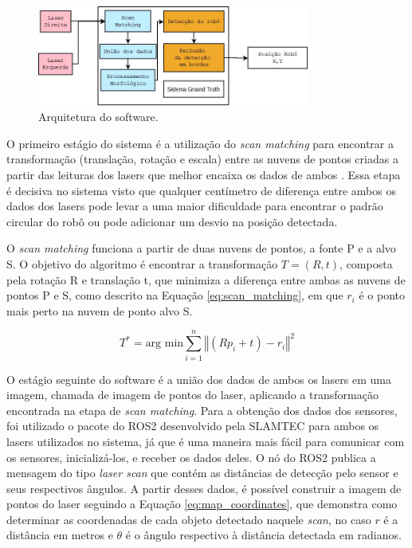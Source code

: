 \documentclass[acronym, symbols, table, deposito]{fei}
\begin{document}
				\begin{figure}[!htb]
					\centering
					\includegraphics[width=0.80\textwidth]{software_architecture.jpeg}
					\caption{Arquitetura do software.} \label{fig:software_architecture}
				\end{figure}
			
				O primeiro estágio do sistema é a utilização do \textit{scan matching} para encontrar a transformação (translação, rotação e escala) entre as nuvens de pontos criadas a partir das leituras dos lasers que melhor encaixa os dados de ambos \cite{NIETO200739}. Essa etapa é decisiva no sistema visto que qualquer centímetro de diferença entre ambos os dados dos lasers pode levar a uma maior dificuldade para encontrar o padrão circular do robô ou pode adicionar um desvio na posição detectada.
								
				O \textit{scan matching} funciona a partir de duas nuvens de pontos, a fonte P e a alvo S. O objetivo do algoritmo é encontrar a transformação $T = (R, t)$, composta pela rotação R e translação t, que minimiza a diferença entre ambas as nuvens de pontos P e S, como descrito na Equação \eqref{eq:scan_matching}, em que $r_i$ é o ponto mais perto na nuvem de ponto alvo S.
				
				\begin{equation} \label{eq:scan_matching}
					T^* = \text{arg min} \sum_{i=1}^{n}\left\Vert (Rp_i + t) - r_i \right\Vert^2
				\end{equation}
			
				O estágio seguinte do software é a união dos dados de ambos os lasers em uma imagem, chamada de imagem de pontos do laser, aplicando a transformação encontrada na etapa de \textit{scan matching}. Para a obtenção dos dados dos sensores, foi utilizado o pacote do ROS2 desenvolvido pela SLAMTEC para ambos os lasers utilizados no sistema, já que é uma maneira mais fácil para comunicar com os sensores, inicializá-los, e receber os dados deles. O nó do ROS2 publica a mensagem do tipo \textit{laser scan} que contém as distâncias de detecção pelo sensor e seus respectivos ângulos. A partir desses dados, é possível construir a imagem de pontos do laser seguindo a Equação \eqref{eq:map_coordinates}, que demonstra como determinar as coordenadas de cada objeto detectado naquele \textit{scan}, no caso $r$ é a distância em metros e $\theta$ é o ângulo respectivo à distância detectada em radianos.
				
\end{document}

